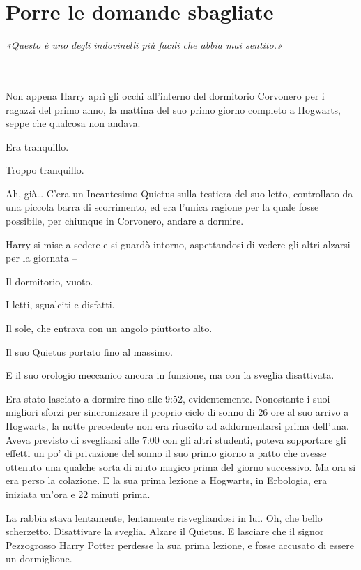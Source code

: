 
\chapter{Porre le domande sbagliate}
\label{capitolo:13}

\emph{«Questo è uno degli indovinelli più facili che abbia mai sentito.»}

~\\
~\\

Non appena Harry aprì gli occhi all’interno del dormitorio Corvonero per i ragazzi del primo anno, la mattina del suo primo giorno completo a Hogwarts, seppe che qualcosa non andava.

Era tranquillo.

Troppo tranquillo.

Ah, già… C’era un Incantesimo Quietus sulla testiera del suo letto, controllato da una piccola barra di scorrimento, ed era l’unica ragione per la quale fosse possibile, per chiunque in Corvonero, andare a dormire.

Harry si mise a sedere e si guardò intorno, aspettandosi di vedere gli altri alzarsi per la giornata –

Il dormitorio, vuoto.

I letti, sgualciti e disfatti.

Il sole, che entrava con un angolo piuttosto alto.

Il suo Quietus portato fino al massimo.

E il suo orologio meccanico ancora in funzione, ma con la sveglia disattivata.

Era stato lasciato a dormire fino alle 9:52, evidentemente. Nonostante i suoi migliori sforzi per sincronizzare il proprio ciclo di sonno di 26 ore al suo arrivo a Hogwarts, la notte precedente non era riuscito ad addormentarsi prima dell’una. Aveva previsto di svegliarsi alle 7:00 con gli altri studenti, poteva sopportare gli effetti un po’ di privazione del sonno il suo primo giorno a patto che avesse ottenuto una qualche sorta di aiuto magico prima del giorno successivo. Ma ora si era perso la colazione. E la sua prima lezione a Hogwarts, in Erbologia, era iniziata un’ora e 22 minuti prima.

La rabbia stava lentamente, lentamente risvegliandosi in lui. Oh, che bello scherzetto. Disattivare la sveglia. Alzare il Quietus. E lasciare che il signor Pezzogrosso Harry Potter perdesse la sua prima lezione, e fosse accusato di essere un dormiglione.

